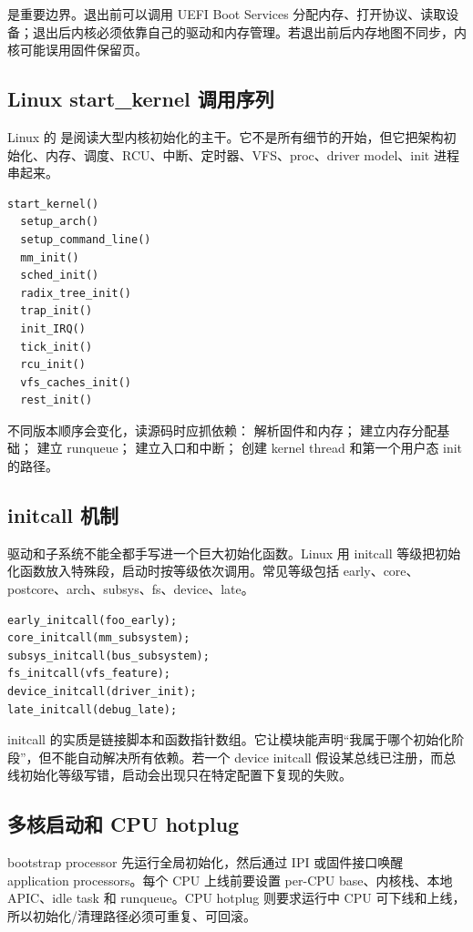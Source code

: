  是重要边界。退出前可以调用 UEFI Boot Services 分配内存、打开协议、读取设备；退出后内核必须依靠自己的驱动和内存管理。若退出前后内存地图不同步，内核可能误用固件保留页。

\subsection{Linux start\_kernel 调用序列}

Linux 的  是阅读大型内核初始化的主干。它不是所有细节的开始，但它把架构初始化、内存、调度、RCU、中断、定时器、VFS、proc、driver model、init 进程串起来。

\begin{lstlisting}
start_kernel()
  setup_arch()
  setup_command_line()
  mm_init()
  sched_init()
  radix_tree_init()
  trap_init()
  init_IRQ()
  tick_init()
  rcu_init()
  vfs_caches_init()
  rest_init()
\end{lstlisting}

不同版本顺序会变化，读源码时应抓依赖： 解析固件和内存； 建立内存分配基础； 建立 runqueue； 建立入口和中断； 创建 kernel thread 和第一个用户态 init 的路径。

\subsection{initcall 机制}

驱动和子系统不能全都手写进一个巨大初始化函数。Linux 用 initcall 等级把初始化函数放入特殊段，启动时按等级依次调用。常见等级包括 early、core、postcore、arch、subsys、fs、device、late。

\begin{lstlisting}
early_initcall(foo_early);
core_initcall(mm_subsystem);
subsys_initcall(bus_subsystem);
fs_initcall(vfs_feature);
device_initcall(driver_init);
late_initcall(debug_late);
\end{lstlisting}

initcall 的实质是链接脚本和函数指针数组。它让模块能声明“我属于哪个初始化阶段”，但不能自动解决所有依赖。若一个 device initcall 假设某总线已注册，而总线初始化等级写错，启动会出现只在特定配置下复现的失败。

\subsection{多核启动和 CPU hotplug}

bootstrap processor 先运行全局初始化，然后通过 IPI 或固件接口唤醒 application processors。每个 CPU 上线前要设置 per-CPU base、内核栈、本地 APIC、idle task 和 runqueue。CPU hotplug 则要求运行中 CPU 可下线和上线，所以初始化/清理路径必须可重复、可回滚。

